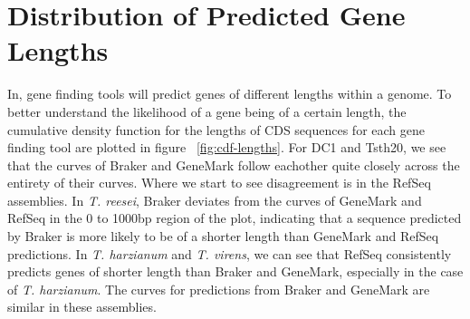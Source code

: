 \section{Distribution of Predicted Gene Lengths}

In, gene finding tools will predict genes of different lengths within
a genome. To better understand the likelihood of a gene being of a
certain length, the cumulative density function for the lengths of CDS
sequences for each gene finding tool are plotted in figure
~\ref{fig:cdf-lengths}. For DC1 and Tsth20, we see that the curves of
Braker and GeneMark follow eachother quite closely across the entirety
of their curves. Where we start to see disagreement is in the RefSeq
assemblies. In \textit{T. reesei}, Braker deviates from the curves of
GeneMark and RefSeq in the 0 to 1000bp region of the plot, indicating
that a sequence predicted by Braker is more likely to be of a shorter
length than GeneMark and RefSeq predictions. In \textit{T. harzianum}
and \textit{T. virens}, we can see that RefSeq consistently predicts
genes of shorter length than Braker and GeneMark, especially in the
case of \textit{T. harzianum}. The curves for predictions from Braker
and GeneMark are similar in these assemblies.

